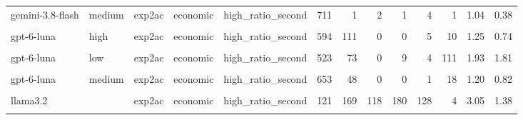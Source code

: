 \documentclass[
]{article}
\begin{document}
\begin{table}[!h]
{\begin{tabular}[t]{lllllrrrrrrrr}
gemini-3.8-flash & medium & exp2ac & economic & high\_ratio\_second & 711 & 1 & 2 & 1 & 4 & 1 & 1.04 & 0.38\\
\cellcolor{gray!10}{gpt-6-luna} & \cellcolor{gray!10}{high} & \cellcolor{gray!10}{exp2ac} & \cellcolor{gray!10}{economic} & \cellcolor{gray!10}{high\_ratio\_first} & \cellcolor{gray!10}{689} & \cellcolor{gray!10}{31} & \cellcolor{gray!10}{0} & \cellcolor{gray!10}{0} & \cellcolor{gray!10}{0} & \cellcolor{gray!10}{0} & \cellcolor{gray!10}{1.04} & \cellcolor{gray!10}{0.20}\\
gpt-6-luna & high & exp2ac & economic & high\_ratio\_second & 594 & 111 & 0 & 0 & 5 & 10 & 1.25 & 0.74\\
\addlinespace
\cellcolor{gray!10}{gpt-6-luna} & \cellcolor{gray!10}{low} & \cellcolor{gray!10}{exp2ac} & \cellcolor{gray!10}{economic} & \cellcolor{gray!10}{high\_ratio\_first} & \cellcolor{gray!10}{644} & \cellcolor{gray!10}{27} & \cellcolor{gray!10}{0} & \cellcolor{gray!10}{0} & \cellcolor{gray!10}{6} & \cellcolor{gray!10}{43} & \cellcolor{gray!10}{1.37} & \cellcolor{gray!10}{1.24}\\
gpt-6-luna & low & exp2ac & economic & high\_ratio\_second & 523 & 73 & 0 & 9 & 4 & 111 & 1.93 & 1.81\\
\cellcolor{gray!10}{gpt-6-luna} & \cellcolor{gray!10}{medium} & \cellcolor{gray!10}{exp2ac} & \cellcolor{gray!10}{economic} & \cellcolor{gray!10}{high\_ratio\_first} & \cellcolor{gray!10}{710} & \cellcolor{gray!10}{6} & \cellcolor{gray!10}{0} & \cellcolor{gray!10}{0} & \cellcolor{gray!10}{0} & \cellcolor{gray!10}{4} & \cellcolor{gray!10}{1.04} & \cellcolor{gray!10}{0.38}\\
gpt-6-luna & medium & exp2ac & economic & high\_ratio\_second & 653 & 48 & 0 & 0 & 1 & 18 & 1.20 & 0.82\\
\cellcolor{gray!10}{llama3.2} & \cellcolor{gray!10}{} & \cellcolor{gray!10}{exp2ac} & \cellcolor{gray!10}{economic} & \cellcolor{gray!10}{high\_ratio\_first} & \cellcolor{gray!10}{3} & \cellcolor{gray!10}{144} & \cellcolor{gray!10}{182} & \cellcolor{gray!10}{143} & \cellcolor{gray!10}{177} & \cellcolor{gray!10}{71} & \cellcolor{gray!10}{3.78} & \cellcolor{gray!10}{1.30}\\
\addlinespace
llama3.2 &  & exp2ac & economic & high\_ratio\_second & 121 & 169 & 118 & 180 & 128 & 4 & 3.05 & 1.38\\
\cellcolor{gray!10}{mistral} & \cellcolor{gray!10}{} & \cellcolor{gray!10}{exp2ac} & \cellcolor{gray!10}{economic} & \cellcolor{gray!10}{high\_ratio\_first} & \cellcolor{gray!10}{225} & \cellcolor{gray!10}{309} & \cellcolor{gray!10}{24} & \cellcolor{gray!10}{122} & \cellcolor{gray!10}{12} & \cellcolor{gray!10}{28} & \cellcolor{gray!10}{2.27} & \cellcolor{gray!10}{1.31}\\

\end{tabular}}
\end{table}
\end{document}
